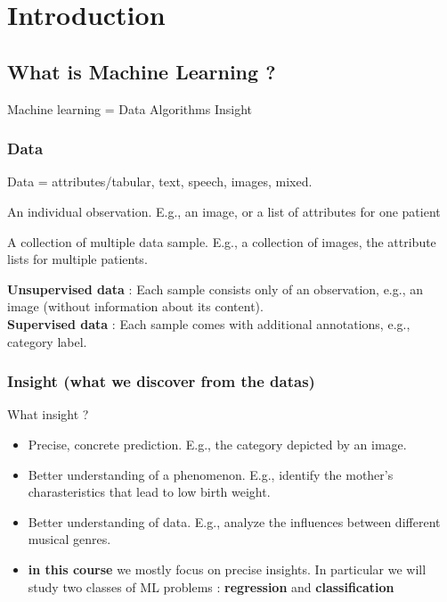 

\chapter{Introduction}%
\section{What is Machine Learning ?}
Machine learning = Data \textrightarrow Algorithms \textrightarrow Insight
\subsection{Data}%
\label{sub:Data}

Data = attributes/tabular, text, speech, images, mixed.

\begin{definition}
  An individual observation. E.g., an image, or a list of attributes for one patient
\end{definition}
\begin{definition}
  A collection of multiple data sample. E.g., a collection of images, the attribute lists for multiple patients.
\end{definition}

\textbf{Unsupervised data} : Each sample consists only of an observation, e.g., an image (without information about its content). \\
\textbf{Supervised data} : Each sample comes with additional annotations, e.g., category label.

\subsection{Insight (what we discover from the datas)}%
\label{sub:Insight}
What insight ?
\begin{itemize}
  \item Precise, concrete prediction. E.g., the category depicted by an image.
  \item Better understanding of a phenomenon. E.g., identify the mother's charasteristics that lead to low birth weight.
  \item Better understanding of data. E.g., analyze the influences between different musical genres.
  \item \textbf{in this course} we mostly focus on precise insights. In particular we will study two classes of ML problems : \textbf{regression} and \textbf{classification}
\end{itemize}

